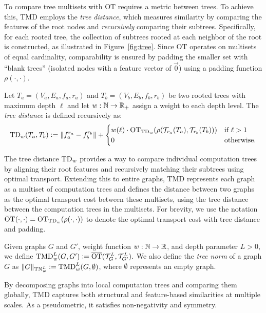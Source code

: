 To compare tree multisets with OT requires a metric between trees. To achieve this, TMD employs the \emph{tree distance}, which measures similarity by comparing the features of the root nodes and \emph{recursively} comparing their subtrees. Specifically, for each rooted tree, the collection of subtrees rooted at each neighbor of the root is constructed, as illustrated in Figure~\ref{fig:tree}. Since OT operates on multisets of equal cardinality, comparability is ensured by padding the smaller set with ``blank trees'' (isolated nodes with a feature vector of $\vec{0}$) using a padding function $\rho(\cdot, \cdot)$.   

\begin{definition}\label{def:TD} Let $T_a = (V_a, E_a, f_a, r_a)$ and $T_b = (V_b, E_b, f_b, r_b)$ be two rooted trees with maximum depth $\ell$  and let $w: {\mathbb N} \to \mathbb R_{+}$ assign a weight to each depth level.
   The \emph{tree distance} is defined recursively as:
\begin{align*}
    \textnormal{TD}_w(T_a, T_b) \mathrel{\mathop:}= \left\lVert f_a^{r_a} - f_b^{r_b}\right\rVert + \begin{cases}
        w(\ell) \cdot \textnormal{OT}_{\textnormal{TD}_w}(\rho(\mathcal T_{r_a}(T_a), \mathcal T_{r_b}(T_b)))  &\text{if }\ell > 1 \\
        0 &\text{otherwise.} 
    \end{cases}\end{align*}
\end{definition}

The tree distance $\textnormal{TD}_w$ provides a way to compare individual computation trees by aligning their root features and recursively matching their subtrees using optimal transport. Extending this to entire graphs, TMD represents each graph as a multiset of computation trees and defines the distance between two graphs as the optimal transport cost between these multisets, using the tree distance between the computation trees in the multisets.  For brevity, we use the notation $\smash{\overline{\textnormal{OT}}}(\cdot, \cdot) = \textnormal{OT}_{\textnormal{TD}_w}(\rho(\cdot, \cdot))$ to denote the optimal transport cost with tree distance and padding.

\begin{definition}\label{def:TMD} Given graphs $G$ and $G'$, weight function $w: {\mathbb N} \to \mathbb R$, and depth parameter $L > 0$, we define 
$\textnormal{TMD}_w^L(G, G') \mathrel{\mathop:}= \smash{\overline{\textnormal{OT}}}(\mathcal T_G^L, \mathcal T_{G'}^L).$
We also define the \emph{tree norm} of a graph $G$ as $\Vert G \Vert_{\textnormal{TN}_w^L} \mathrel{\mathop:}= \textnormal{TMD}_w^L(G, \emptyset)$, where $\emptyset$ represents an empty graph.
\end{definition}
By decomposing graphs into local computation trees and comparing them globally, TMD captures both structural and feature-based similarities at multiple scales. As a pseudometric, it satisfies non-negativity and symmetry.
